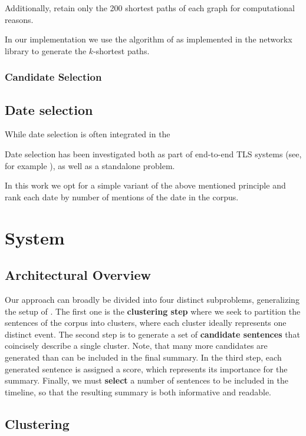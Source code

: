 \documentclass[a4paper,BCOR=10mm]{report}
\begin{document}
Additionally, \citet{banerjee} retain only the 200 shortest paths of each graph for computational reasons.

In our implementation we use the algorithm of \citet{kshortestpath} as implemented in the networkx library \citep{networkx} to generate the $k$-shortest paths.

\subsection{Candidate Selection}

\section{Date selection}

While date selection is often integrated in the 

Date selection has been investigated both as part of end-to-end TLS systems (see, for example \citet{trans}), as well as a standalone problem.


In this work we opt for a simple variant of the above mentioned principle and rank each date by number of mentions of the date in the corpus.

\chapter{System}

\section{Architectural Overview}

Our approach can broadly be divided into four distinct subproblems, generalizing the setup of \citet{banerjee}.
The first one is the \textbf{clustering step} where we seek to partition the sentences of the corpus into clusters, where each cluster ideally represents one distinct event.
The second step is to generate a set of \textbf{candidate sentences} that coincisely describe a single cluster. Note, that many more candidates are generated than can be included in the final summary.
In the third step, each generated sentence is assigned a score, which represents its importance for the summary.
Finally, we must \textbf{select} a number of sentences to be included in the timeline, so that the resulting summary is both informative and readable.

\section{Clustering}
\end{document}

